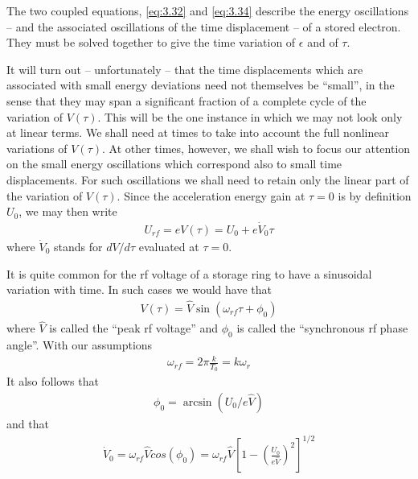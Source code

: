 The two coupled equations, \eqref{eq:3.32} and \eqref{eq:3.34} describe the energy oscillations -- and the associated oscillations of the time displacement -- of a stored electron. They must be solved together to give the time variation of $\epsilon$ and of $\tau$.

It will turn out -- unfortunately -- that the time displacements which are associated with small energy deviations need not themselves be ``small'', in the sense that they may span a significant fraction of a complete cycle of the variation of $V(\tau)$. This will be the one instance in which we may not look only at linear terms. We shall need at times to take into account the full nonlinear variations of $V(\tau)$. At other times, however, we shall wish to focus our attention on the small energy oscillations which correspond also to small time displacements. For such oscillations we shall need to retain only the linear part of the variation of $V(\tau)$. Since the acceleration energy gain at $\tau = 0$ is by definition $U_0$, we may then write
\begin{align}
	U_{rf} = eV(\tau) = U_0 + e\dot{V}_0\tau\label{eq:3.35}
\end{align}
where $\dot{V}_0$ stands for $dV/d\tau$ evaluated at $\tau=0$.

It is quite common for the rf voltage of a storage ring to have a sinusoidal variation with time. In such cases we would have that
\begin{align}\label{eq:3.36}
	V(\tau) = \widehat{V} \sin(\omega_{rf}\tau+\phi_0)
\end{align}
where $\widehat{V}$ is called the ``peak rf voltage'' and $\phi_0$  is called the ``synchronous rf phase angle''. With our assumptions
\begin{align}
	\omega_{rf} = 2\pi \frac{k}{T_0} = k\omega_r
\end{align}
It also follows that
\begin{align}
	\phi_0 = \arcsin(U_0/e\widehat{V})
\end{align}
and that
\begin{align}
	\dot{V}_0 = \omega_{rf}\widehat{V}cos(\phi_0) = \omega_{rf}\widehat{V}\left[1-\left(\frac{U_0}{e\widehat{V}}\right)^2\right]^{1/2}
\end{align}

